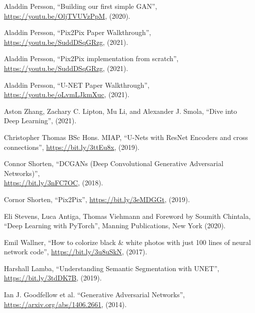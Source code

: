 \documentclass[a4paper]{article}
\begin{document}
\renewcommand{\refname}{Tài liệu tham khảo}
\begin{thebibliography}{80}\label{references}

     Aladdin Persson, ``Building our first simple GAN'', \href{https://youtu.be/OljTVUVzPpM}{https://youtu.be/OljTVUVzPpM}, (2020).

     Aladdin Persson, ``Pix2Pix Paper Walkthrough'', \href{https://youtu.be/SuddDSqGRzg}{https://youtu.be/SuddDSqGRzg}, (2021).

     Aladdin Persson, ``Pix2Pix implementation from scratch'', \href{https://youtu.be/SuddDSqGRzg}{https://youtu.be/SuddDSqGRzg}, (2021).

     Aladdin Persson, ``U-NET Paper Walkthrough'', \href{https://youtu.be/oLvmLJkmXuc}{https://youtu.be/oLvmLJkmXuc}, (2021).
    
     Aston Zhang, Zachary C. Lipton, Mu Li, and Alexander J. Smola, ``Dive into Deep Learning'', (2021).
    
     Christopher Thomas BSc Hons. MIAP, ``U-Nets with ResNet Encoders and cross connections'', \href{https://bit.ly/3ttEu8x}{https://bit.ly/3ttEu8x}, (2019).

     Connor Shorten, ``DCGANs (Deep Convolutional Generative Adversarial Networks)'',\\ \href{https://bit.ly/3nFC7OC}{https://bit.ly/3nFC7OC}, (2018).

     Cornor Shorten, ``Pix2Pix'', \href{https://bit.ly/3eMDGGt}{https://bit.ly/3eMDGGt}, (2019).

     Eli Stevens, Luca Antiga, Thomas Viehmann and Foreword by Soumith Chintala, ``Deep Learning with PyTorch'', Manning Publications, New York (2020).

     Emil Wallner, ``How to colorize black \& white photos with just 100 lines of neural network code'', \href{https://bit.ly/3u8uSkN}{https://bit.ly/3u8uSkN}, (2017).

     Harshall Lamba, ``Understanding Semantic Segmentation with UNET'', \href{https://bit.ly/3tdDK7B}{https://bit.ly/3tdDK7B}, (2019).

     Ian J. Goodfellow et al. ``Generative Adversarial Networks'', \href{https://arxiv.org/abs/1406.2661}{https://arxiv.org/abs/1406.2661}, (2014).


\end{thebibliography}
\end{document}
